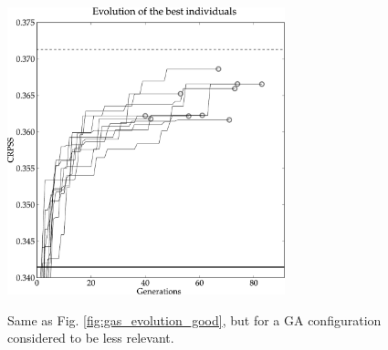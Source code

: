 \documentclass{ametsoc}
\begin{document}
\begin{figure}[t]
	\begin{center}
		\noindent\includegraphics[width=19pc,angle=0]{fig04.pdf}\\
	\end{center}
	\caption{Same as Fig. \ref{fig:gas_evolution_good}, but for a GA configuration considered to be less relevant.}
	\label{fig:gas_evolution_bad}
\end{figure}
\end{document}
